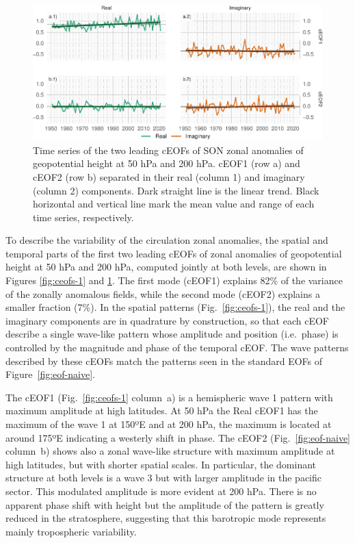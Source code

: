 \documentclass[smallextended]{svjour3}       %
\begin{document}
\begin{figure}
\includegraphics{../figures/extended-series-1} \caption{Time series of the two leading cEOFs of SON zonal anomalies of geopotential height at 50 hPa and 200 hPa. cEOF1 (row a) and cEOF2 (row b) separated in their real (column 1) and imaginary (column 2) components. Dark straight line is the linear trend. Black horizontal and vertical line mark the mean value and range of each time series, respectively.}\label{fig:extended-series}
\end{figure}

To describe the variability of the circulation zonal anomalies, the spatial and temporal parts of the first two leading cEOFs of zonal anomalies of geopotential height at 50 hPa and 200 hPa, computed jointly at both levels, are shown in Figures \ref{fig:ceofs-1} and \ref{fig:extended-series}.
The first mode (cEOF1) explains 82\% of the variance of the zonally anomalous fields, while the second mode (cEOF2) explains a smaller fraction (7\%).
In the spatial patterns (Fig.~\ref{fig:ceofs-1}), the real and the imaginary components are in quadrature by construction, so that each cEOF describe a single wave-like pattern whose amplitude and position (i.e.~phase) is controlled by the magnitude and phase of the temporal cEOF.
The wave patterns described by these cEOFs match the patterns seen in the standard EOFs of Figure~\ref{fig:eof-naive}.

The cEOF1 (Fig.~\ref{fig:ceofs-1} column~a) is a hemispheric wave 1 pattern with maximum amplitude at high latitudes.
At 50 hPa the Real cEOF1 has the maximum of the wave 1 at 150ºE and at 200 hPa, the maximum is located at around 175ºE indicating a westerly shift in phase.
The cEOF2 (Fig.~\ref{fig:eof-naive} column~b) shows also a zonal wave-like structure with maximum amplitude at high latitudes, but with shorter spatial scales.
In particular, the dominant structure at both levels is a wave 3 but with larger amplitude in the pacific sector.
This modulated amplitude is more evident at 200 hPa.
There is no apparent phase shift with height but the amplitude of the pattern is greatly reduced in the stratosphere, suggesting that this barotropic mode represents mainly tropospheric variability.
\end{document}
